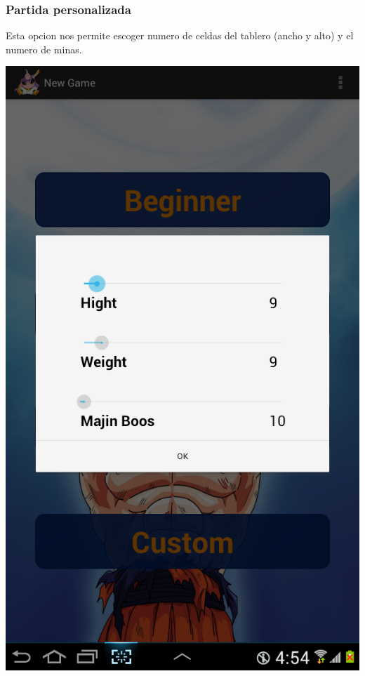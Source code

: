 \documentclass[11pt]{article} %
\begin{document}
\subsubsection{Partida personalizada}
Esta opcion nos permite escoger numero de celdas del tablero (ancho y alto) y el numero de minas.
\begin{center}
\includegraphics[scale=0.2]{Imagenes/SSCustom01.png}

\end{center}
\end{document}
